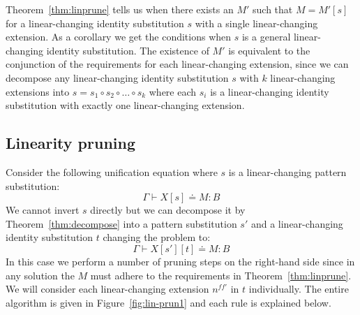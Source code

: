 \documentclass{eptcs}
\theoremstyle{definition}
\begin{document}
Theorem~\ref{thm:linprune} tells us when there exists an $M'$ such that
$M=M'[s]$ for a linear-changing identity substitution $s$ with a
single linear-changing extension.  As a corollary we get the conditions
when $s$ is a general linear-changing identity substitution.  The
existence of $M'$ is equivalent to the
conjunction of the requirements for each linear-changing extension,
since we can decompose any linear-changing identity substitution $s$
with $k$ linear-changing extensions into
$s=s_1\circ s_2\circ\dots\circ s_k$ where each $s_i$ is a
linear-changing identity substitution with exactly one linear-changing
extension.

\subsection{Linearity pruning}
Consider the following unification equation where $s$ is a
linear-changing pattern substitution:
\[
\Gamma\vdash X[s]\doteq M : B
\]
We cannot invert $s$ directly but we can decompose it by
Theorem~\ref{thm:decompose} into a pattern
substitution $s'$ and a linear-changing identity substitution $t$
changing the problem to:
\[
\Gamma\vdash X[s'][t]\doteq M : B
\]
In this case we perform a number of pruning steps on the right-hand side
since in any solution the $M$ must adhere to the requirements in
Theorem~\ref{thm:linprune}.  We will consider each linear-changing
extension $n^{ff'}$ in $t$ individually.
The entire algorithm is given in Figure~\ref{fig:lin-prun1}
and each rule is explained below.
\end{document}

